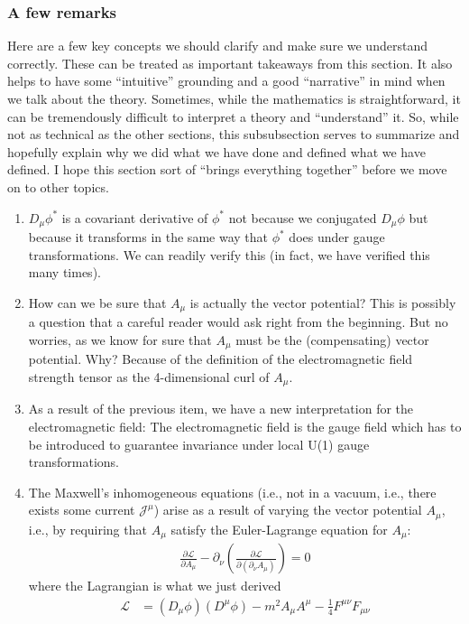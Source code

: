 \documentclass[a4paper,11pt]{article}
\numberwithin{equation}{section}
\theoremstyle{definition}
\newcommand{\p}{\partial}
\newcommand{\lag}{\mathcal{L}}
\begin{document}
\subsubsection{A few remarks}
Here are a few key concepts we should clarify and make sure we understand correctly. These can be treated as important takeaways from this section. It also helps to have some ``intuitive'' grounding and a good ``narrative'' in mind when we talk about the theory. Sometimes, while the mathematics is straightforward, it can be tremendously difficult to interpret a theory and ``understand'' it. So, while not as technical as the other sections, this subsubsection serves to summarize and hopefully explain why we did what we have done and defined what we have defined. I hope this section sort of ``brings everything together'' before we move on to other topics. 
\begin{enumerate}
	\item $D_\mu\phi^*$ is a covariant derivative of $\phi^*$ not because we conjugated $D_\mu\phi$ but because it transforms in the same way that $\phi^*$ does under gauge transformations. We can readily verify this (in fact, we have verified this many times). 
	\item How can we be sure that $A_\mu$ is actually the vector potential? This is possibly a question that a careful reader would ask right from the beginning. But no worries, as we know for sure that $A_\mu$ must be the (compensating) vector potential. Why? Because of the definition of the electromagnetic field strength tensor as the 4-dimensional curl of $A_\mu$. 
	\item As a result of the previous item, we have a new interpretation for the electromagnetic field: The electromagnetic field is the gauge field which has to be introduced to guarantee invariance under local U(1) gauge transformations. 
	\item The Maxwell's inhomogeneous equations (i.e., not in a vacuum, i.e., there exists some current $\mathcal{J}^\mu$) arise as a result of varying the vector potential $A_\mu$, i.e., by requiring that $A_\mu$ satisfy the Euler-Lagrange equation for $A_\mu$:
	\begin{align}
	\frac{\p\lag}{\p A_\mu} - \p_\nu \left( \frac{\p\lag}{\p(\p_\nu A_\mu)} \right) = 0
	\end{align}
	where the Lagrangian is what we just derived
	\begin{align}
	\lag &= (D_\mu\phi)(D^\mu\phi) - m^2 A_\mu A^\mu - \frac{1}{4}F^{\mu\nu}F_{\mu\nu} \\

\end{align}
\end{enumerate}
\end{document}
